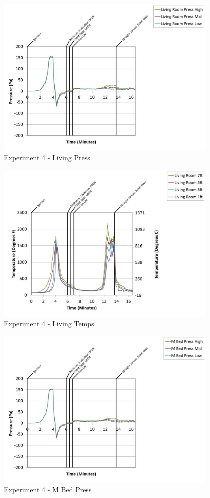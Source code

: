 \documentclass{article}
\begin{document}
\begin{appendices}
	\clearpage

	\begin{figure}[h!]
		\centering
		\includegraphics[height=3.05in]{0_Images/Results_Charts/Exp_4_Charts/LivingPress.pdf}
		\caption{Experiment 4 - Living Press}
	\end{figure}
 

	\begin{figure}[h!]
		\centering
		\includegraphics[height=3.05in]{0_Images/Results_Charts/Exp_4_Charts/LivingTemps.pdf}
		\caption{Experiment 4 - Living Temps}
	\end{figure}
 
	\clearpage

	\begin{figure}[h!]
		\centering
		\includegraphics[height=3.05in]{0_Images/Results_Charts/Exp_4_Charts/MBedPress.pdf}
		\caption{Experiment 4 - M Bed Press}
	\end{figure}
 


\end{appendices}
\end{document}
